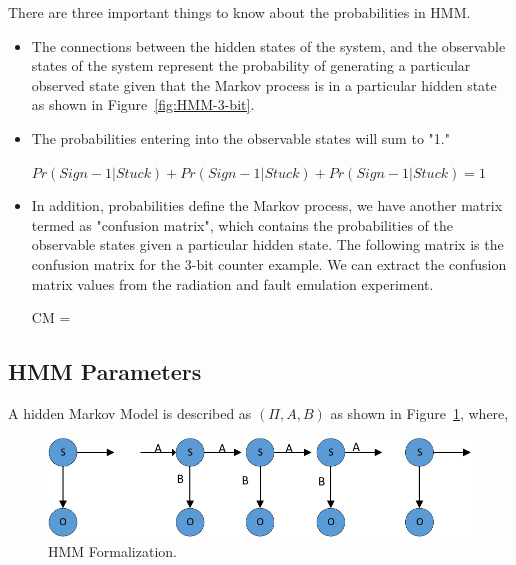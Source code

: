 There are three important things to know about the probabilities in HMM.

\begin{itemize}
\item The connections between the hidden states of the system, and the observable states of the system represent the probability of generating a particular observed state given that the Markov process is in a particular hidden state as shown in Figure~\ref{fig:HMM-3-bit}.

\item The probabilities entering into the observable states will sum to "1." 

\begin{center}
$Pr(Sign-1|Stuck) + Pr(Sign-1|Stuck) + Pr(Sign-1|Stuck)  = 1 $
\end{center}

\item In addition, probabilities define the Markov process, we have another matrix termed as "confusion matrix", which contains the probabilities of the observable states given a particular hidden state. The following matrix is the confusion matrix for the 3-bit counter example. We can extract the confusion matrix values from the radiation and fault emulation experiment.


\begin{center}


CM = 
\end{center}
\end{itemize}


\subsection{HMM Parameters}

A hidden Markov Model is described as $(\Pi, A, B)$ as shown in Figure~\ref{fig:MARKOV-SERIS}, where,


\begin{figure}[tb!]

 \centering
  \captionsetup{justification=centering}    
   \includegraphics[scale=0.8]{Figures/MARKOV-SERIS.pdf}
   \caption{HMM Formalization.}
\label{fig:MARKOV-SERIS}
\end{figure}



